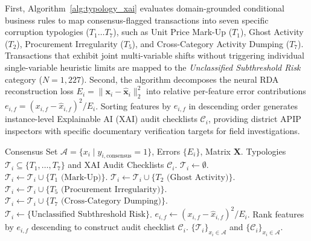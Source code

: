 \documentclass[runningheads]{llncs}
\begin{document}
First, Algorithm~\ref{alg:typology_xai} evaluates domain-grounded conditional business rules to map consensus-flagged transactions into seven specific corruption typologies ($T_1 \dots T_7$), such as Unit Price Mark-Up ($T_1$), Ghost Activity ($T_2$), Procurement Irregularity ($T_5$), and Cross-Category Activity Dumping ($T_7$). Transactions that exhibit joint multi-variable shifts without triggering individual single-variable heuristic limits are mapped to the \textit{Unclassified Subthreshold Risk} category ($N=1,227$). Second, the algorithm decomposes the neural RDA reconstruction loss $E_i = \|\mathbf{x}_i - \hat{\mathbf{x}}_i\|_2^2$ into relative per-feature error contributions $e_{i,f} = (x_{i,f} - \hat{x}_{i,f})^2 / E_i$. Sorting features by $e_{i,f}$ in descending order generates instance-level Explainable AI (XAI) audit checklists $\mathcal{C}_i$, providing district APIP inspectors with specific documentary verification targets for field investigations.

\begin{algorithm}[htbp]
\caption{Operational Policy Typology Mapping and XAI Loss Attribution}
\label{alg:typology_xai}
\begin{algorithmic}[1]
\REQUIRE Consensus Set $\mathcal{A} = \{x_i \mid y_{i, \text{consensus}} = 1\}$, Errors $\{E_i\}$, Matrix $\mathbf{X}$.
\ENSURE Typologies $\mathcal{T}_i \subseteq \{T_1, \dots, T_7\}$ and XAI Audit Checklists $\mathcal{C}_i$.
    \STATE $\mathcal{T}_i \leftarrow \emptyset$.
     \STATE $\mathcal{T}_i \leftarrow \mathcal{T}_i \cup \{T_1 \text{ (Mark-Up)}\}$. \ENDIF
     \STATE $\mathcal{T}_i \leftarrow \mathcal{T}_i \cup \{T_2 \text{ (Ghost Activity)}\}$. \ENDIF
     \STATE $\mathcal{T}_i \leftarrow \mathcal{T}_i \cup \{T_5 \text{ (Procurement Irregularity)}\}$. \ENDIF
     \STATE $\mathcal{T}_i \leftarrow \mathcal{T}_i \cup \{T_7 \text{ (Cross-Category Dumping)}\}$. \ENDIF
     \STATE $\mathcal{T}_i \leftarrow \{\text{Unclassified Subthreshold Risk}\}$. \ENDIF
        \STATE $e_{i,f} \leftarrow (x_{i,f} - \hat{x}_{i,f})^2 / E_i$.
    \ENDFOR
    \STATE Rank features by $e_{i,f}$ descending to construct audit checklist $\mathcal{C}_i$.
\ENDFOR
\RETURN $\{\mathcal{T}_i\}_{x_i \in \mathcal{A}}$ and $\{\mathcal{C}_i\}_{x_i \in \mathcal{A}}$.
\end{algorithmic}
\end{algorithm}
\end{document}

